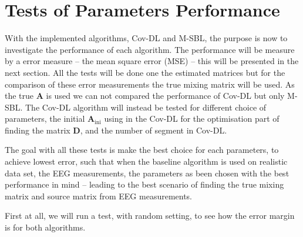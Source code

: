 \section{Tests of Parameters Performance}
With the implemented algorithms, Cov-DL and M-SBL, the purpose is now to investigate the performance of each algorithm. The performance will be measure by a error measure -- the mean square error (MSE) -- this will be presented in the next section. 
All the tests will be done one the estimated matrices but for the comparison of these error measurements the true mixing matrix will be used. 
As the true $\mathbf{A}$ is used we can not compared the performance of Cov-DL but only M-SBL. 
The Cov-DL algorithm will instead be tested for different choice of parameters, the initial $\mathbf{A}_{\text{ini}}$ using in the Cov-DL for the optimisation part of finding the matrix $\mathbf{D}$, and the number of segment in Cov-DL.

The goal with all these tests is make the best choice for each parameters, to achieve lowest error, such that when the baseline algorithm is used on realistic data set, the EEG measurements, the parameters as been chosen with the best performance in mind -- leading to the best scenario of finding the true mixing matrix and source matrix from EEG measurements.

First at all, we will run a test, with random setting, to see how the error margin is for both algorithms.
